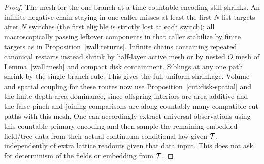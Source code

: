 \begin{proof}
The mesh for the one-branch-at-a-time countable encoding still shrinks. An infinite negative chain staying
in one caller misses at least the first \(N\) list targets after \(N\) switches (the first eligible is
strictly lost at each switch); all macroscopically passing leftover components in that caller stabilize by
finite targets as in Proposition~\ref{wall:returns}. Infinite chains containing repeated canonical restarts instead shrink by half-layer
active mesh or by nested \(O\) mesh of Lemma~\ref{wall:mesh} and compact disk containment. Siblings at any one path shrink by the
single-branch rule. This gives the full uniform shrinkage. Volume and spatial coupling for these routes now
use Proposition~\ref{cut:disk-spatial} and the finite-depth area dominance, since offspring interiors are area-additive and
the false-pinch and joining comparisons are along countably many compatible cut paths with this mesh. One
can accordingly extract universal observations using this countable primary encoding and then sample the
remaining embedded field/tree data from their actual continuum conditional law given \({\cal T}\),
independently of extra lattice readouts given that data input. This does not ask for determinism of the
fields or embedding from \({\cal T}\).

\end{proof}


